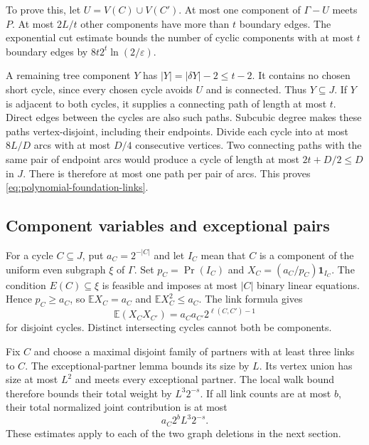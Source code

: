 To prove this, let $U=V(C)\cup V(C')$.
At most one component of $\Gamma-U$ meets $P$.
At most $2L/t$ other components have more than $t$ boundary edges.
The exponential cut estimate bounds the number of cyclic components with at most $t$ boundary edges by $8t2^t\ln(2/\varepsilon)$.

A remaining tree component $Y$ has $|Y|=|\delta Y|-2\le t-2$.
It contains no chosen short cycle, since every chosen cycle avoids $U$ and is connected.
Thus $Y\subseteq J$.
If $Y$ is adjacent to both cycles, it supplies a connecting path of length at most $t$.
Direct edges between the cycles are also such paths.
Subcubic degree makes these paths vertex-disjoint, including their endpoints.
Divide each cycle into at most $8L/D$ arcs with at most $D/4$ consecutive vertices.
Two connecting paths with the same pair of endpoint arcs would produce a cycle of length at most $2t+D/2\le D$ in $J$.
There is therefore at most one path per pair of arcs.
This proves \eqref{eq:polynomial-foundation-links}.

\subsection{Component variables and exceptional pairs}
For a cycle $C\subseteq J$, put $a_C=2^{-|C|}$ and let $I_C$ mean that $C$ is a component of the uniform even subgraph $\xi$ of $\Gamma$.
Set $p_C=\Pr(I_C)$ and $X_C=(a_C/p_C)\mathbf1_{I_C}$.
The condition $E(C)\subseteq\xi$ is feasible and imposes at most $|C|$ binary linear equations.
Hence $p_C\ge a_C$, so $\mathbb EX_C=a_C$ and $\mathbb EX_C^2\le a_C$.
The link formula gives
\[
 \mathbb E(X_CX_{C'})=a_Ca_{C'}2^{\ell(C,C')-1}
\]
for disjoint cycles.
Distinct intersecting cycles cannot both be components.

Fix $C$ and choose a maximal disjoint family of partners with at least three links to $C$.
The exceptional-partner lemma bounds its size by $L$.
Its vertex union has size at most $L^2$ and meets every exceptional partner.
The local walk bound therefore bounds their total weight by $L^3 2^{-s}$.
If all link counts are at most $b$, their total normalized joint contribution is at most
\[
 a_C2^bL^3 2^{-s}.
\]
These estimates apply to each of the two graph deletions in the next section.
